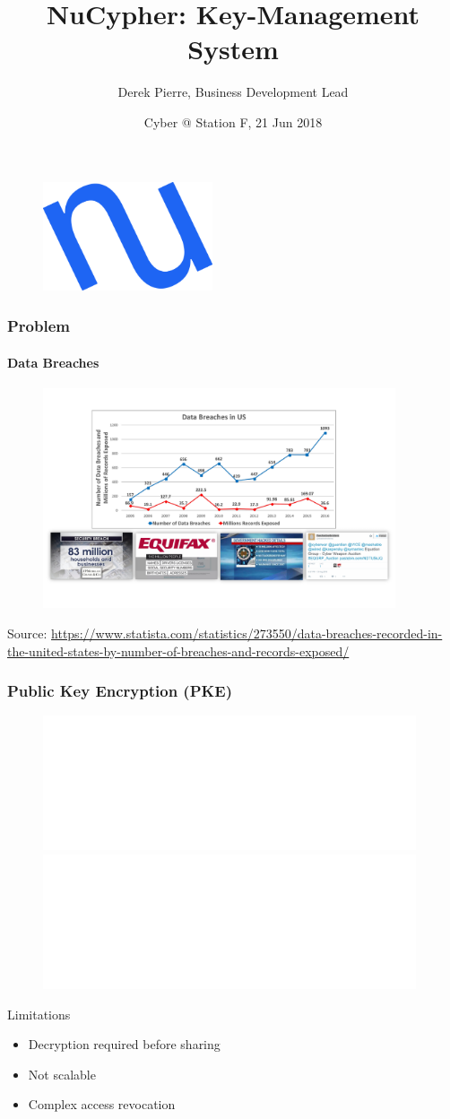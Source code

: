 \documentclass[xetex,mathsans,sans]{beamer}
\title[NuCypher]{NuCypher: Key-Management System}
\author[Derek]{Derek Pierre, Business Development Lead}
\date[21 Jun 2018]{Cyber @ Station F, 21 Jun 2018}
\begin{document}
    \begin{frame}
        \titlepage
        \begin{figure}
            \centering
            \includegraphics[width=5cm]{pdf/nucypher_logo.pdf}
        \end{figure}
    \end{frame}

    \begin{frame}
      \frametitle{Problem}
      \framesubtitle{Data Breaches}
        \begin{figure}
            \centering
            \includegraphics[height=6.5cm]{pdf/data-breaches.pdf}
        \end{figure}

        {\tiny Source: \url{https://www.statista.com/statistics/273550/data-breaches-recorded-in-the-united-states-by-number-of-breaches-and-records-exposed/} \par}
    \end{frame}

    \begin{frame}
        \frametitle{Public Key Encryption (PKE)}
        \begin{figure}
            \centering
            \includegraphics<1>[width=11cm]{pdf/pke-multi.pdf}
            \includegraphics<2>[width=11cm]{pdf/pke-multi-hack.pdf}
        \end{figure}

        Limitations
        \begin{itemize}
            \item Decryption required before sharing
            \item Not scalable
            \item Complex access revocation
        \end{itemize}
    \end{frame}
\end{document}
